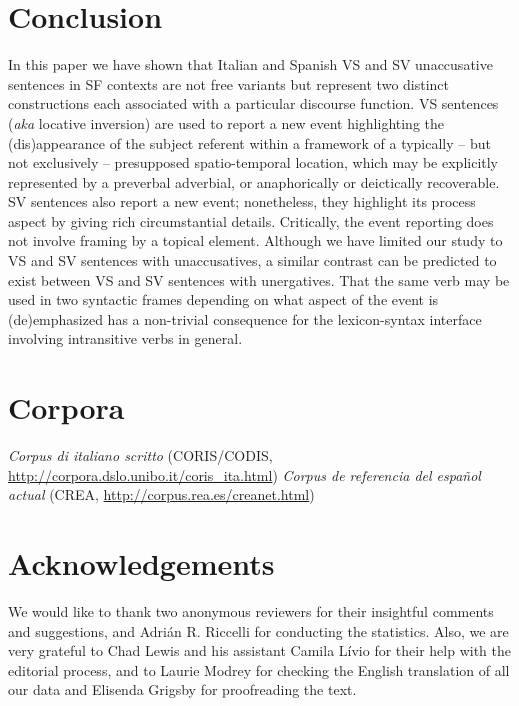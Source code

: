 \documentclass[output=paper,colorlinks,citecolor=brown,
]{langscibook}
\begin{document}
\section{Conclusion}\label{sec:nishida:5}

In this paper we have shown that Italian and Spanish VS and SV unaccusative sentences in SF contexts are not free variants but represent two distinct constructions each associated with a particular discourse function. VS sentences (\textit{aka} locative inversion) are used to report a new event highlighting the (dis)appearance of the subject referent within a framework of a typically – but not exclusively – presupposed spatio-temporal location, which may be explicitly represented by a preverbal adverbial, or anaphorically or deictically recoverable. SV sentences also report a new event; nonetheless, they highlight its process aspect by giving rich circumstantial details. Critically, the event reporting does not involve framing by a topical element. Although we have limited our study to VS and SV sentences with unaccusatives, a similar contrast can be predicted to exist between VS and SV sentences with unergatives. That the same verb may be used in two syntactic frames depending on what aspect of the event is (de)emphasized has a non-trivial consequence for the lexicon-syntax interface involving intransitive verbs in general. 

\section*{Corpora}

\textit{Corpus di italiano scritto} (CORIS/CODIS, \url{http://corpora.dslo.unibo.it/coris_ita.html})
\textit{Corpus de referencia del español actual} (CREA, \url{http://corpus.rea.es/creanet.html})

\section*{Acknowledgements}

We would like to thank two anonymous reviewers for their insightful comments and suggestions, and Adrián R. Riccelli for conducting the statistics. Also, we are very grateful to Chad Lewis and his assistant Camila Lívio for their help with the editorial process, and to Laurie Modrey for checking the English translation of all our data and Elisenda Grigsby for proofreading the text.

\printbibliography[heading=subbibliography,notkeyword=this]
\end{document}
